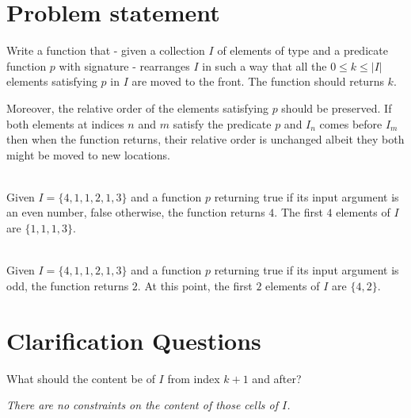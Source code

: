 \section{Problem statement}
\begin{exercise}
\label{example:remove_all_occurrences_unsorted_array_inplace:exercice1}
Write a function that -  given a collection $I$ of elements of type 
 and a predicate function
 $p$ with signature  -  rearranges $I$ in such a way that all the $0 \leq k
 \leq |I|$ elements satisfying $p$ in $I$ are moved to the front. The function should returns $k$.

 Moreover, the relative order of the elements  satisfying $p$ should be preserved. If both elements
 at indices $n$ and $m$ satisfy the predicate $p$  and $I_n$ comes before $I_m$ then when the
 function returns, their relative order is unchanged albeit they both might be moved to new
 locations.
 
	\begin{example}
		\label{example:remove_all_occurrences_unsorted_array_inplace:example1}
		\hfill \\
		Given $I = \{{4, 1, 1, 2, 1, 3\}}$ and a function $p$ returning true if its input argument is an even number, false otherwise, the function returns $4$. The first $4$ elements of $I$ are $\{1,1,1,3\}$. 
		
	\end{example}

	\begin{example}
		\label{example:remove_all_occurrences_unsorted_array_inplace:example2}
		\hfill \\
		Given $I = \{4, 1, 1, 2, 1, 3\}$ and a function $p$ returning true if its input argument is odd, the function returns $2$. At this point, the first $2$ elements of $I$ are $\{4,2\}$. 
		
	\end{example}
\end{exercise}

\section{Clarification Questions}

\begin{QandA}
	\item \begin{questionitem} \begin{question} What should the content be of $I$ from index $k+1$ and after?  \end{question} 	 
    \begin{answered}
		\textit{There are no constraints on the content of those cells of $I$.}
	\end{answered} \end{questionitem}
	
\end{QandA}

